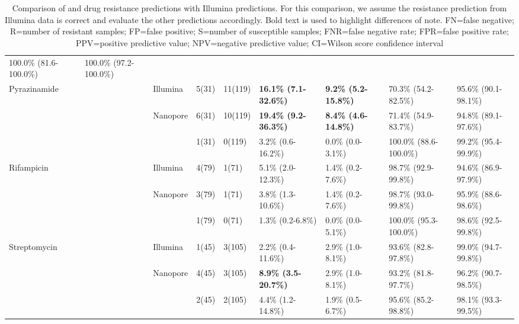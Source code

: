 \begin{table}
{\begin{tabular}{@{}lllllllll@{}}
  100.0\% (81.6-100.0\%) &
  100.0\% (97.2-100.0\%) \\ \cmidrule(l){2-9} 
\multirow{3}{*}{Pyrazinamide} &
  \multirow{2}{*}{\drprg{}} &
  Illumina &
  5(31) &
  11(119) &
  \textbf{16.1\% (7.1-32.6\%)} &
  \textbf{9.2\% (5.2-15.8\%)} &
  70.3\% (54.2-82.5\%) &
  95.6\% (90.1-98.1\%) \\
 &
   &
  \multirow{2}{*}{Nanopore} &
  6(31) &
  10(119) &
  \textbf{19.4\% (9.2-36.3\%)} &
  \textbf{8.4\% (4.6-14.8\%)} &
  71.4\% (54.9-83.7\%) &
  94.8\% (89.1-97.6\%) \\
 &
  \mykrobe{} &
   &
  1(31) &
  0(119) &
  3.2\% (0.6-16.2\%) &
  0.0\% (0.0-3.1\%) &
  100.0\% (88.6-100.0\%) &
  99.2\% (95.4-99.9\%) \\ \cmidrule(l){2-9} 
\multirow{3}{*}{Rifampicin} &
  \multirow{2}{*}{\drprg{}} &
  Illumina &
  4(79) &
  1(71) &
  5.1\% (2.0-12.3\%) &
  1.4\% (0.2-7.6\%) &
  98.7\% (92.9-99.8\%) &
  94.6\% (86.9-97.9\%) \\
 &
   &
  \multirow{2}{*}{Nanopore} &
  3(79) &
  1(71) &
  3.8\% (1.3-10.6\%) &
  1.4\% (0.2-7.6\%) &
  98.7\% (93.0-99.8\%) &
  95.9\% (88.6-98.6\%) \\
 &
  \mykrobe{} &
   &
  1(79) &
  0(71) &
  1.3\% (0.2-6.8\%) &
  0.0\% (0.0-5.1\%) &
  100.0\% (95.3-100.0\%) &
  98.6\% (92.5-99.8\%) \\ \cmidrule(l){2-9} 
\multirow{3}{*}{Streptomycin} &
  \multirow{2}{*}{\drprg{}} &
  Illumina &
  1(45) &
  3(105) &
  2.2\% (0.4-11.6\%) &
  2.9\% (1.0-8.1\%) &
  93.6\% (82.8-97.8\%) &
  99.0\% (94.7-99.8\%) \\
 &
   &
  \multirow{2}{*}{Nanopore} &
  4(45) &
  3(105) &
  \textbf{8.9\% (3.5-20.7\%)} &
  2.9\% (1.0-8.1\%) &
  93.2\% (81.8-97.7\%) &
  96.2\% (90.7-98.5\%) \\
 &
  \mykrobe{} &
   &
  2(45) &
  2(105) &
  4.4\% (1.2-14.8\%) &
  1.9\% (0.5-6.7\%) &
  95.6\% (85.2-98.8\%) &
  98.1\% (93.3-99.5\%) \\ \cmidrule(l){2-9} 
\end{tabular}%
}
\caption{Comparison of \drprg{} and \mykrobe{} \ont{} drug resistance predictions with \mykrobe{} Illumina predictions. For this comparison, we assume the \mykrobe{} resistance prediction from Illumina data is correct and evaluate the other predictions accordingly. Bold text is used to highlight differences of note. FN=false negative; R=number of resistant samples; FP=false positive; S=number of susceptible samples; FNR=false negative rate; FPR=false positive rate; PPV=positive predictive value; NPV=negative predictive value; CI=Wilson score confidence interval}
\label{tab:geno-concordance}
\end{table}

